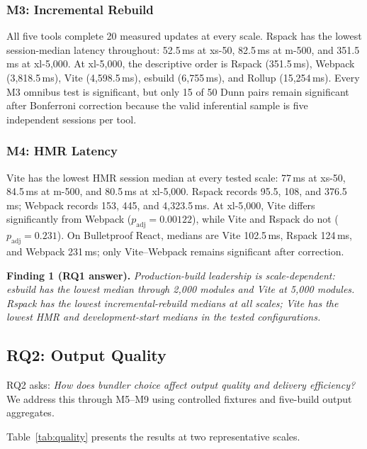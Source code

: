 \documentclass[preprint,12pt]{elsarticle}
\begin{document}
\subsubsection{M3: Incremental Rebuild}

All five tools complete 20 measured updates at every scale.
Rspack has the lowest session-median latency throughout: 52.5\,ms at xs-50, 82.5\,ms at m-500, and 351.5\,ms at xl-5{,}000.
At xl-5{,}000, the descriptive order is Rspack (351.5\,ms), Webpack (3{,}818.5\,ms), Vite (4{,}598.5\,ms), esbuild (6{,}755\,ms), and Rollup (15{,}254\,ms).
Every M3 omnibus test is significant, but only 15 of 50 Dunn pairs remain significant after Bonferroni correction because the valid inferential sample is five independent sessions per tool.

\subsubsection{M4: HMR Latency}

Vite has the lowest HMR session median at every tested scale: 77\,ms at xs-50, 84.5\,ms at m-500, and 80.5\,ms at xl-5{,}000.
Rspack records 95.5, 108, and 376.5\,ms; Webpack records 153, 445, and 4{,}323.5\,ms.
At xl-5{,}000, Vite differs significantly from Webpack ($p_\text{adj}=0.00122$), while Vite and Rspack do not ($p_\text{adj}=0.231$).
On Bulletproof React, medians are Vite 102.5\,ms, Rspack 124\,ms, and Webpack 231\,ms; only Vite--Webpack remains significant after correction.

\medskip\noindent\textbf{Finding 1 (RQ1 answer).} \textit{Production-build leadership is scale-dependent: esbuild has the lowest median through 2{,}000 modules and Vite at 5{,}000 modules. Rspack has the lowest incremental-rebuild medians at all scales; Vite has the lowest HMR and development-start medians in the tested configurations.}


\subsection{RQ2: Output Quality}\label{sec:rq2}

RQ2 asks: \emph{How does bundler choice affect output quality and delivery efficiency?}
We address this through M5--M9 using controlled fixtures and five-build output aggregates.

Table~\ref{tab:quality} presents the results at two representative scales.
\end{document}
